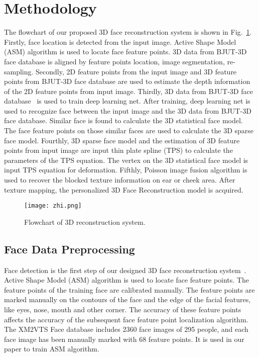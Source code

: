 \documentclass[10pt,twocolumn,letterpaper]{article}
\begin{document}
\section{Methodology}
The flowchart of our proposed 3D face reconstruction system is shown in Fig.~\ref{fig:1}. Firstly, face location is detected from the input image. Active Shape Model (ASM) algorithm is used to locate face feature points. 3D data from BJUT-3D face database is aligned by feature points location, image segmentation, re-sampling. Secondly, 2D feature points from the input image and 3D feature points from BJUT-3D face database are used to estimate the depth information of the 2D feature points from input image. Thirdly, 3D data from BJUT-3D face database~\cite{Lin2010Accurate} is used to train deep learning net. After training, deep learning net is used to recognize face between the input image and the 3D data from BJUT-3D face database. Similar face is found to calculate the 3D statistical face model. The face feature points on those similar faces are used to calculate the 3D sparse face model. Fourthly, 3D sparse face model and the estimation of 3D feature points from input image are input thin plate spline (TPS) to calculate the parameters of the TPS equation. The vertex on the 3D statistical face model is input TPS equation for deformation. Fifthly, Poisson image fusion  algorithm is used to recover the blocked texture information on ear or cheek area. After texture mapping, the personalized 3D Face Reconstruction model is acquired.

\begin{figure}[!htb]
\begin{center}
\texttt{[image: zhi.png]}
\end{center}
\caption{ Flowchart of 3D reconstruction system.}
\label{fig:1}
\end{figure}
\subsection{Face Data Preprocessing}
Face detection is the first step of our designed 3D face reconstruction system~\cite{Liu2016Joint}. Active Shape Model (ASM) algorithm is used to locate face feature points. The feature points of the training face are calibrated manually. The feature points are marked manually on the contours of the face and the edge of the facial features, like eyes, nose, mouth and other corner. The accuracy of these feature points affects the accuracy of the subsequent face feature point localization algorithm. The XM2VTS Face database includes 2360 face images of 295 people, and each face image has been manually marked with 68 feature points. It is used in our paper to train ASM algorithm.

{\small


}
\end{document}
